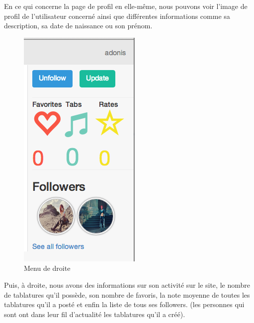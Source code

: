 En ce qui concerne la page de profil en elle-même, nous pouvons voir l'image de profil de l'utilisateur concerné ainsi que différentes informations comme sa description, sa date de naissance ou son prénom. \\

\begin{figure}[H]
\centering
\includegraphics[scale=0.5]{rightWEB}
\caption{Menu de droite}
\end{figure}

Puis, à droite, nous avons des informations sur son activité sur le site, le nombre de tablatures qu'il possède, son nombre de favoris, la note moyenne de toutes les tablatures qu'il a posté et enfin la liste de tous ses followers. (les personnes qui sont ont dans leur fil d'actualité les tablatures qu'il a créé).
